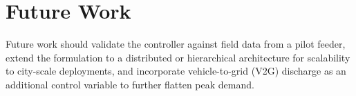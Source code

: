 \section{Future Work}
Future work should validate the controller against field data from a pilot feeder, extend the
formulation to a distributed or hierarchical architecture for scalability to city-scale
deployments, and incorporate vehicle-to-grid (V2G) discharge as an additional control variable
to further flatten peak demand.

\begingroup
\renewcommand{\chapter}[2][]{\vspace{0.6cm}}
{}
\endgroup
